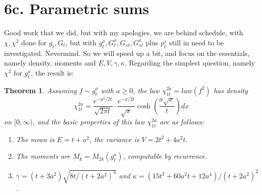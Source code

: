 \documentclass[12pt]{amsbook}
\newtheorem{theorem}{Theorem}[chapter]
\begin{document}
\section*{6c. Parametric sums}

Good work that we did, but with my apologies, we are behind schedule, with $\chi,\chi^2$ done for $g_t,G_t$, but with $g_t^a,G_t^a,G_{st},G_{st}^a$ plus $p^s_t$ still in need to be investigated. Nevermind. So we will speed up a bit, and focus on the essentials, namely density, moments and $E,V,\gamma,\kappa$. Regarding the simplest question, namely $\chi^2$ for $g_t^a$, the result is:

\begin{theorem}
Assuming $f\sim g_t^a$ with $a\geq0$, the law $\chi_{1t}^{2a}=law(f^2)$ has density
$$\chi^{2a}_{1t}=\frac{e^{-a^2/2t}}{\sqrt{2\pi t}}\cdot\frac{e^{-x/2t}}{\sqrt{x}}\cosh\left(\frac{a\sqrt{x}}{t}\right)dx$$
on $[0,\infty)$, and the basic properties of this law $\chi_{1t}^{2a}$ are as follows:
\begin{enumerate}
\item The mean is $E=t+a^2$, the variance is $V=2t^2+4a^2t$.

\item The moments are $M_k=M_{2k}(g_t^a)$, computable by recurrence.

\item $\gamma=(t+3a^2)\sqrt{8t/(t+2a^2)^3}$ and $\kappa=(15t^2+60a^2t+12a^4)/(t+2a^2)^2$.
\end{enumerate}
\end{theorem}
\end{document}
